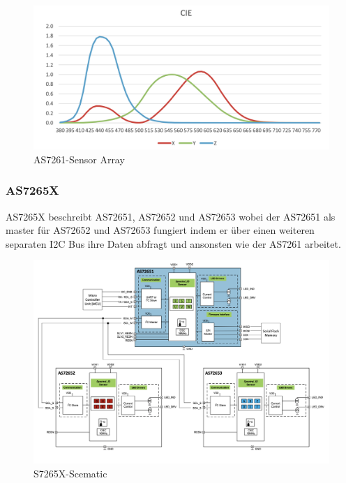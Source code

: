   

\begin{figure}[H]
  \centering
 \includegraphics[width=0.6\linewidth]{img/AS7261-Spectral_Responsivity.png}
  \caption{AS7261-Sensor Array}
  \label{fig:AS7261-Sensor_Array}
\end{figure}

\subsubsection{AS7265X}\label{AS7265X}
AS7265X beschreibt AS72651, AS72652 und AS72653 wobei der AS72651 als master für AS72652 und AS72653 fungiert indem er über einen weiteren separaten I2C Bus ihre Daten abfragt und ansonsten wie der AS7261 arbeitet.

\begin{figure}[H]
  \centering
 \includegraphics[width=0.9\linewidth]{img/AS7265X-Scematic.png}
  \caption{S7265X-Scematic}
  \label{fig:S7265X-Scematic}
\end{figure}



